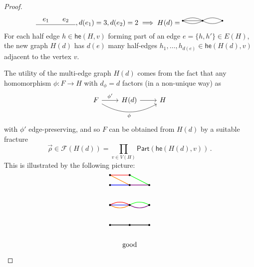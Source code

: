 \documentclass[authorcolumns,numberwithinsect]{no-lipics-v2022}
\newcommand{\he}{\mathsf{he}}
\begin{document}
\begin{proof}
\[\begin{tikzpicture}
    \draw (0,0) --node[midway, above] {$e_1$} (1,0) --node[midway, above] {$e_2$} (2,0);
\end{tikzpicture}, d(e_1)=3, d(e_2)=2 \implies H(d) = 
\begin{tikzpicture}
    \draw[fill] (0,0) circle (1pt);
    \draw[fill] (1,0) circle (1pt);
    \draw[fill] (2,0) circle (1pt);

    \draw (0,0) -- (1,0);
    \draw (0,0) to[bend left] (1,0);
    \draw (0,0) to[bend right] (1,0);
    \draw (1,0) to[bend left] (2,0);
    \draw (1,0) to[bend right] (2,0);
\end{tikzpicture}
\]
For each half edge $h \in \he(H, v)$ forming part of an edge $e=\{h,h'\} \in E(H)$, the new graph $H(d)$ has $d(e)$ many half-edges $h_1, \ldots, h_{d(e)} \in \he(H(d), v)$ adjacent to the vertex $v$.

The utility of the multi-edge graph $H(d)$ comes from the fact that any homomorphism $\phi: F \to H$ with $d_\phi=d$ factors (in a non-unique way) as 
\[
\begin{tikzcd}
    F \arrow[r, "\phi'"] \arrow[rr, bend right, "\phi", swap] & H(d) \arrow[r] & H
\end{tikzcd}
\]
 with $\phi'$ edge-preserving, and so $F$ can be obtained from $H(d)$ by a suitable fracture
\[
\vec\rho \in \mathcal{F}(H(d)) = \prod_{v \in V(H)} \mathsf{Part}(\he(H(d), v))\,.
\]
This is illustrated by the following picture:
\[
\begin{tikzpicture}[thick]
\begin{scope}[yshift=1cm]
    \draw[blue] (0,0) -- (1,0);
    \draw[red] (0,0.5) to (1,0.5);
    \draw[orange] (0,0.5) to (1,0);
    \draw[green] (1,0.5) to (2,0);
    \draw[violet] (1,0) to (2,0);
    \draw[fill] (0,0) circle (1pt);
    \draw[fill] (0,0.5) circle (1pt);
    \draw[fill] (1,0) circle (1pt);
    \draw[fill] (1,0.5) circle (1pt);
    \draw[fill] (2,0) circle (1pt);
\end{scope}
    \draw[blue] (0,0) -- (1,0);
    \draw[red] (0,0) to[bend left] (1,0);
    \draw[orange] (0,0) to[bend right] (1,0);
    \draw[green] (1,0) to[bend left] (2,0);
    \draw[violet] (1,0) to[bend right] (2,0);
    \draw[fill] (0,0) circle (1pt);
    \draw[fill] (1,0) circle (1pt);
    \draw[fill] (2,0) circle (1pt);
    \draw (1,-2) node {\text{good}};
\begin{scope}[yshift=-1cm]
    \draw[fill] (0,0) circle (1pt);
    \draw[fill] (1,0) circle (1pt);
    \draw[fill] (2,0) circle (1pt);

    \draw (0,0) -- (1,0) -- (2,0);
\end{scope}



\end{tikzpicture}\]
\end{proof}
\end{document}
